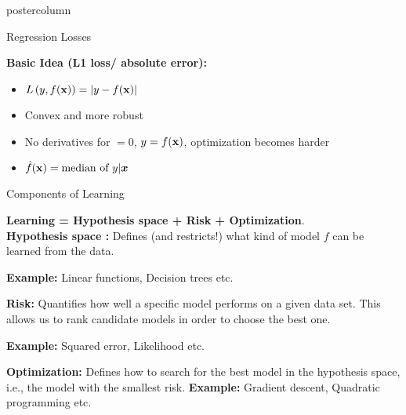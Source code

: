 \documentclass{beamer}
\begin{document}
\begin{frame}[fragile]{}
\begin{columns}
\begin{column}{.31\textwidth}
\begin{beamercolorbox}[center]{postercolumn}
\begin{minipage}{.98\textwidth}
{\begin{myblock}{Regression Losses}
            
              \textbf{Basic Idea (L1 loss/ absolute error):} 
            \begin{itemize}     \setlength{\itemindent}{+.3in}
              \item $L\left(y, f(\mathbf{x})\right) = |y-f(\mathbf{x})|$
              \item Convex and more robust
              \item No derivatives for $ = 0$, $y = f(\mathbf{x})$, optimization becomes harder
              \item $\hat{f}(\mathbf{x}) = \text{median of } y | \bm{x}$      
            \end{itemize}
          \end{myblock}
          \begin{myblock}{Components of Learning}
  
            \textbf{Learning = Hypothesis space + Risk  + Optimization}. \\
        
            \textbf{Hypothesis space : } Defines (and restricts!) what kind of model $f$
        can be learned from the data.
            
            \hspace*{1ex} \textbf{Example:} Linear functions, Decision trees etc.
          
          \vspace*{0.5ex}
          
          \textbf{Risk: }Quantifies how well a specific model performs on a given
        data set. This allows us to rank candidate models in order to choose the best one.
        
          \hspace*{1ex} \textbf{Example:} Squared error, Likelihood etc.
          
          \vspace*{0.5ex}
          
          \textbf{Optimization: }Defines how to search for the best model in the hypothesis space, i.e., the model with the smallest {risk}.
          \hspace*{1ex} \textbf{Example:} Gradient descent, Quadratic programming etc.
        
            
          \end{myblock}

}
\end{minipage}
\end{beamercolorbox}
\end{column}
\end{columns}
\end{frame}
\end{document}
